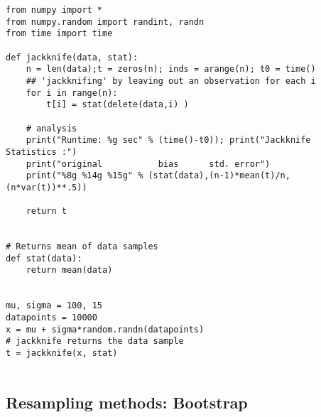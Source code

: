 \documentclass[%
oneside,                 %
final,                   %
10pt]{article}
\begin{document}
\begin{verbatim}
from numpy import *
from numpy.random import randint, randn
from time import time

def jackknife(data, stat):
    n = len(data);t = zeros(n); inds = arange(n); t0 = time()
    ## 'jackknifing' by leaving out an observation for each i                                                                                                                      
    for i in range(n):
        t[i] = stat(delete(data,i) )

    # analysis                                                                                                                                                                     
    print("Runtime: %g sec" % (time()-t0)); print("Jackknife Statistics :")
    print("original           bias      std. error")
    print("%8g %14g %15g" % (stat(data),(n-1)*mean(t)/n, (n*var(t))**.5))

    return t


# Returns mean of data samples                                                                                                                                                     
def stat(data):
    return mean(data)


mu, sigma = 100, 15
datapoints = 10000
x = mu + sigma*random.randn(datapoints)
# jackknife returns the data sample                                                                                                                                                
t = jackknife(x, stat)


\end{verbatim}


\subsection*{Resampling methods: Bootstrap}

\end{document}
